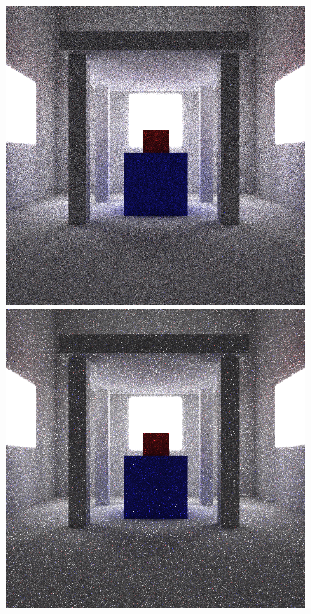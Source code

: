 \documentclass[ %
                    author={Callum Pearce},
                supervisor={Dr. Neill Campbell},
                    degree={MEng},
                     title={Learning the incident radiance for a continuous state space rather than a discrete one is more beneficial for Importance Sampling in Monte Carlo Path Tracing},
                  subtitle={},
                      type={research},
                      year={2019} ]{dissertation}
\begin{document}
\begin{figure}[h]
\centering
{}
  \includegraphics[width=\textwidth]{images/renders/shelter/default.png}   
\endminipage\hspace{1em}
  \includegraphics[width=\textwidth]{images/renders/shelter/sarsa.png}   

\end{figure}
\end{document}
